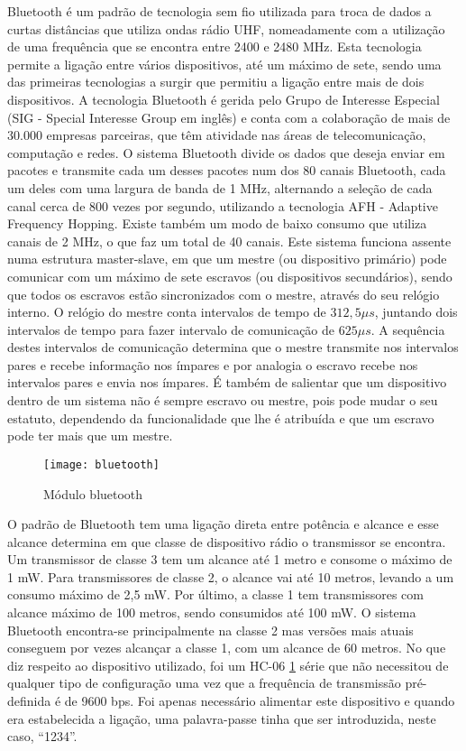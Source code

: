 Bluetooth é um padrão de tecnologia sem fio utilizada para troca de dados a curtas distâncias que utiliza ondas rádio UHF, nomeadamente com a utilização de uma frequência que se encontra entre 2400 e 2480 MHz.
Esta tecnologia permite a ligação entre vários dispositivos, até um máximo de sete, sendo uma das primeiras tecnologias a surgir que permitiu a ligação entre mais de dois dispositivos.
A tecnologia Bluetooth é gerida pelo Grupo de Interesse Especial (SIG - Special Interesse Group em inglês) e conta com a colaboração de mais de 30.000 empresas parceiras, que têm atividade nas áreas de telecomunicação, computação e redes.
O sistema Bluetooth divide os dados que deseja enviar em pacotes e transmite cada um desses pacotes num dos 80 canais Bluetooth, cada um deles com uma largura de banda de 1 MHz, alternando a seleção de cada canal cerca de 800 vezes por segundo, utilizando a tecnologia AFH - Adaptive Frequency Hopping.
Existe também um modo de baixo consumo que utiliza canais de 2 MHz, o que faz um total de 40 canais.
Este sistema funciona assente numa estrutura master-slave, em que um mestre (ou dispositivo primário) pode comunicar com um máximo de sete escravos (ou dispositivos secundários), sendo que todos os escravos estão sincronizados com o mestre, através do seu relógio interno.
O relógio do mestre conta intervalos de tempo de $312,5 \mu s$, juntando dois intervalos de tempo para fazer intervalo de comunicação de $625 \mu s$.
A sequência destes intervalos de comunicação determina que o mestre transmite nos intervalos pares e recebe informação nos ímpares e por analogia o escravo recebe nos intervalos pares e envia nos ímpares.
É também de salientar que um dispositivo dentro de um sistema não é sempre escravo ou mestre, pois pode mudar o seu estatuto, dependendo da funcionalidade que lhe é atribuída e que um escravo pode ter mais que um mestre.

\begin{figure}[hbtp]
	\centering
	\texttt{[image: bluetooth]}
	\caption[Módulo bluetooth]{Módulo bluetooth \footnotemark}
	\label{fig:modulo_bluetooth}
\end{figure}

O padrão de Bluetooth tem uma ligação direta entre potência e alcance e esse alcance determina em que classe de dispositivo rádio o transmissor se encontra.
Um transmissor de classe 3 tem um alcance até 1 metro e consome o máximo de 1 mW.
Para transmissores de classe 2, o alcance vai até 10 metros, levando a um consumo máximo de 2,5 mW.
Por último, a classe 1 tem transmissores com alcance máximo de 100 metros, sendo consumidos até 100 mW.
O sistema Bluetooth encontra-se principalmente na classe 2 mas versões mais atuais conseguem por vezes alcançar a classe 1, com um alcance de 60 metros.
No que diz respeito ao dispositivo utilizado, foi um HC-06 \ref{fig:modulo_bluetooth} série que não necessitou de qualquer tipo de configuração uma vez que a frequência de transmissão pré-definida é de 9600 bps.
Foi apenas necessário alimentar este dispositivo e quando era estabelecida a ligação, uma palavra-passe tinha que ser introduzida, neste caso, ``1234''.

